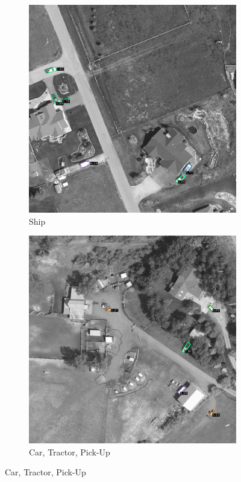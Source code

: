 \begin{figure}[h!]
    \begin{subfigure}[t]{0.38\textwidth}
        \centering
        \includegraphics[width=\linewidth]{images/015Results/03ablation/comp_images/green/509.png}
        \caption{Ship}
    \end{subfigure}
    \begin{subfigure}[t]{0.38\textwidth}
        \centering
        \includegraphics[width=\linewidth]{images/015Results/03ablation/comp_images/green/523.png}
        \caption{Car, Tractor, Pick-Up}
    \end{subfigure}
    

\end{figure}
